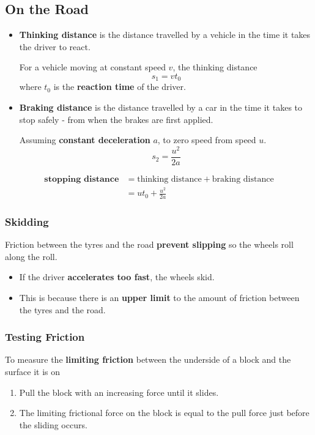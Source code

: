 \subsection{On the Road}

\begin{itemize}
    \item \textbf{Thinking distance} is the distance travelled by a vehicle in the time it takes the driver to react.

        For a vehicle moving at constant speed $v$, the thinking distance
        $$s_1=vt_0$$
        where $t_0$ is the \textbf{reaction time} of the driver.

    \item \textbf{Braking distance} is the distance travelled by a car in the time it takes to stop safely - from when the brakes are first applied.

        Assuming \textbf{constant deceleration} $a$, to zero speed from speed $u$.
        $$s_2=\frac{u^2}{2a}$$
\end{itemize}

\begin{align*}
    \textbf{stopping distance}&=\text{thinking distance}+\text{braking distance}\\
                              &=ut_0+\frac{u^2}{2a}
\end{align*}

\subsubsection*{Skidding}

Friction between the tyres and the road \textbf{prevent slipping} so the wheels roll along the roll.

\begin{itemize}
    \item If the driver \textbf{accelerates too fast}, the wheels skid.
    \item This is because there is an \textbf{upper limit} to the amount of friction between the tyres and the road.
\end{itemize}

\subsubsection*{Testing Friction}

To measure the \textbf{limiting friction} between the underside of a block and the surface it is on
\begin{enumerate}
    \item Pull the block with an increasing force until it slides.
    \item The limiting frictional force on the block is equal to the pull force just before the sliding occurs.
\end{enumerate}

